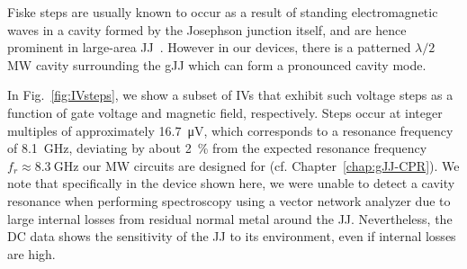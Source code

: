 Fiske steps are usually known to occur as a result of standing electromagnetic waves in a cavity formed by the Josephson junction itself, and are hence prominent in large-area JJ~\cite{krasnovFiskeStepsIntrinsic1999,kimFiskeStepsStudied2005,yabukiSupercurrentVanWaals2016b,liHighQualityEpitaxialMgB22017}.
%
However in our devices, there is a patterned $\lambda/2$ MW cavity surrounding the gJJ which can form a pronounced cavity mode.


In Fig.~\ref{fig:IVsteps}, we show a subset of IVs that exhibit such voltage steps as a function of gate voltage and magnetic field, respectively.
%
Steps occur at integer multiples of approximately \SI{16.7}{\micro\volt}, which corresponds to a resonance frequency of \SI{8.1}{\giga\hertz}, deviating by about \SI{2}{\percent} from the expected resonance frequency $f_r\approx\SI{8.3}{\giga\hertz}$ our MW circuits are designed for (cf. Chapter~\ref{chap:gJJ-CPR}).
%
We note that specifically in the device shown here, we were unable to detect a cavity resonance when performing spectroscopy using a vector network analyzer due to large internal losses from residual normal metal around the JJ.
%
Nevertheless, the DC data shows the sensitivity of the JJ to its environment, even if internal losses are high.

